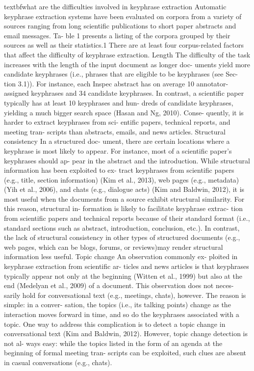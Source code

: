 textbf{what are the difficulties involved in keyphrase extraction}
Automatic keyphrase extraction systems have been evaluated on corpora from a variety of
sources ranging from long scientific publications to short paper abstracts and email messages. Ta- ble 1 presents a listing of the corpora grouped by their sources as well as their statistics.1 There are at least four corpus-related factors that affect the difficulty of keyphrase extraction.
Length The difficulty of the task increases with the length of the input document as longer doc- uments yield more candidate keyphrases (i.e., phrases that are eligible to be keyphrases (see Sec- tion 3.1)). For instance, each Inspec abstract has on average 10 annotator-assigned keyphrases and 34 candidate keyphrases. In contrast, a scientific paper typically has at least 10 keyphrases and hun- dreds of candidate keyphrases, yielding a much bigger search space (Hasan and Ng, 2010). Conse- quently, it is harder to extract keyphrases from sci- entific papers, technical reports, and meeting tran- scripts than abstracts, emails, and news articles.
Structural consistency In a structured doc- ument, there are certain locations where a keyphrase is most likely to appear. For instance, most of a scientific paper’s keyphrases should ap- pear in the abstract and the introduction. While structural information has been exploited to ex- tract keyphrases from scientific papers (e.g., title, section information) (Kim et al., 2013), web pages (e.g., metadata) (Yih et al., 2006), and chats (e.g., dialogue acts) (Kim and Baldwin, 2012), it is most useful when the documents from a source exhibit structural similarity. For this reason, structural in- formation is likely to facilitate keyphrase extrac- tion from scientific papers and technical reports because of their standard format (i.e., standard sections such as abstract, introduction, conclusion, etc.). In contrast, the lack of structural consistency in other types of structured documents (e.g., web pages, which can be blogs, forums, or reviews)may render structural information less useful. Topic change An observation commonly ex- ploited in keyphrase extraction from scientific ar- ticles and news articles is that keyphrases typically appear not only at the beginning (Witten et al., 1999) but also at the end (Medelyan et al., 2009) of a document. This observation does not neces- sarily hold for conversational text (e.g., meetings, chats), however. The reason is simple: in a conver- sation, the topics (i.e., its talking points) change as the interaction moves forward in time, and so do the keyphrases associated with a topic. One way to address this complication is to detect a topic change in conversational text (Kim and Baldwin, 2012). However, topic change detection is not al- ways easy: while the topics listed in the form of an agenda at the beginning of formal meeting tran- scripts can be exploited, such clues are absent in casual conversations (e.g., chats).
